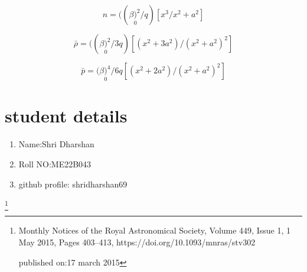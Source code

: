  \begin{equation}
         n=((\beta\underset{0})^2/q)[x^3/x^2+a^2]
 \end{equation}

\begin{equation}
    \bar{\rho}=((\beta\underset{0})^2/3q)[(x^2+3a^2)/(x^2+a^2)^2]
\end{equation}

\begin{equation}
    \bar{p}=(\beta\underset{0})^4/6q[(x^2+2a^2)/(x^2+a^2)^2]
\end{equation}


\section{student details}
\begin{enumerate}
    \item  Name:Shri Dharshan
    \item Roll NO:ME22B043
    \item github profile: shridharshan69
\end{enumerate}
 
\footnote{Monthly Notices of the Royal Astronomical Society, Volume 449, Issue 1, 1 May 2015, Pages 403–413, https://doi.org/10.1093/mnras/stv302

published on:17 march 2015}

